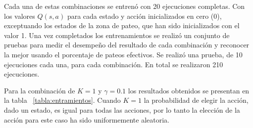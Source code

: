 Cada una de estas combinaciones se entrenó con 20 ejecuciones completas. Con los valores $Q(s,a)$ para cada estado y acción inicializados en cero (0), exceptuando los estados de la zona de pateo, que han sido inicializados con el valor 1. Una vez completados los entrenamientos se realizó un conjunto de pruebas para medir el desempeño del resultado de cada combinación y reconocer la mejor usando el porcentaje de pateos efectivos. Se realizó una prueba, de 10 ejecuciones cada una, para cada combinación. En total se realizaron 210 ejecuciones. 

Para la combinaci\'on de $K = 1$ y $ \gamma = 0.1 $ los resultados obtenidos se presentan en la tabla ~\ref{tabla:entramientos}. Cuando $K = 1$ la probabilidad de elegir la acci\'on, dado un estado, es igual para todas las acciones, por lo tanto la elección de la acción para este caso ha sido uniformemente aleatoria. 



